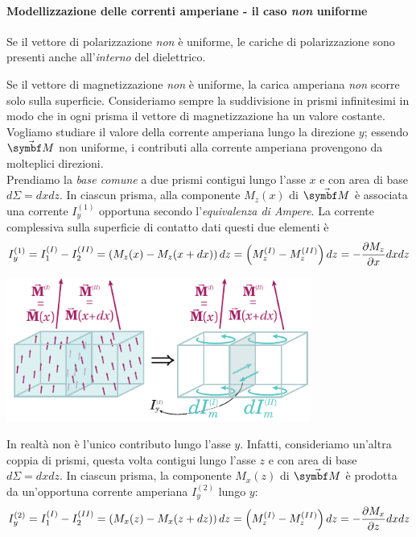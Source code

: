\paragraph{Modellizzazione delle correnti amperiane - il caso \textit{non} uniforme}
\begin{remember}
	Se il vettore di polarizzazione \textit{non} è uniforme, le cariche di polarizzazione sono presenti anche all'\textit{interno} del dielettrico.
\end{remember}
\noindent Se il vettore di magnetizzazione \textit{non} è uniforme, la carica amperiana \textit{non} scorre solo sulla superficie. Consideriamo sempre la suddivisione in prismi infinitesimi in modo che in ogni prisma il vettore di magnetizzazione ha un valore costante. Vogliamo studiare il valore della corrente amperiana lungo la direzione $y$; essendo $\vba{M}$ non uniforme, i contributi alla corrente amperiana provengono da molteplici direzioni.\\
Prendiamo la \textit{base comune} a due prismi contigui lungo l'asse $x$ e con area di base $d\Sigma=dxdz$. In ciascun prisma, alla componente $M_z(x)$ di $\vba{M}$ è associata una corrente $I_y^{(1)}$ opportuna secondo l'\textit{equivalenza di Ampere}. La corrente complessiva sulla superficie di contatto dati questi due elementi è
\begin{equation*}
	I_y^{(1)}=I_1^{(I)}-I_2^{(II)}=\left(M_z(x)-M_z(x+dx)\right)dz=\left(M_z^{(I)}-M_z^{(II)}\right)dz=-\pdv{M_z}{x}dxdz
\end{equation*}
\begin{center}
	\includegraphics[width=0.75\textwidth]{images/chp12/chp12momento4.pdf}
\end{center}
In realtà non è l'unico contributo lungo l'asse $y$. Infatti, consideriamo un'altra coppia di prismi, questa volta contigui lungo l'asse $z$ e con area di base $d\Sigma=dxdz$. In ciascun prisma, la componente $M_x(z)$ di $\vba{M}$ è prodotta da un'opportuna corrente amperiana $I_y^{(2)}$ lungo $y$:
\begin{equation*}
	I_y^{(2)}=I_1^{(I)}-I_2^{(II)}=\left(M_x(z)-M_x(z+dz)\right)dz=\left(M_z^{(I)}-M_z^{(II)}\right)dz=-\pdv{M_x}{z}dxdz
\end{equation*}
